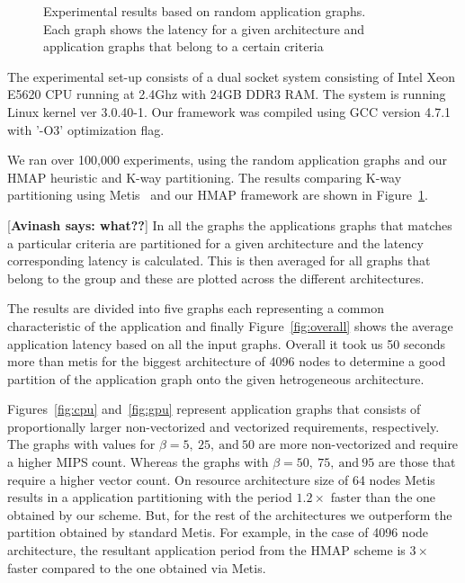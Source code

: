 \begin{figure}[ht!]
{    \label{fig:overall}
  }
  \caption{Experimental results based on random application
  graphs.\\ Each graph shows the latency for a given architecture and
  application graphs that belong to a certain criteria}
  \label{fig:exp-res}
\end{figure}

The experimental set-up consists of a dual socket system consisting of
Intel Xeon E5620 CPU running at 2.4Ghz with 24GB DDR3 RAM. The system
is running Linux kernel ver 3.0.40-1. Our framework was compiled
using GCC version 4.7.1 with '-O3' optimization flag.

We ran over 100,000 experiments, using the random application graphs and
our HMAP heuristic and K-way partitioning.  The results comparing K-way
partitioning using Metis~\cite{gkar95} and our HMAP framework are shown
in Figure~\ref{fig:exp-res}. 

[\textbf{Avinash says: what??}] In all the graphs the applications
graphs that matches a particular criteria are partitioned for a given
architecture and the latency corresponding latency is calculated. This
is then averaged for all graphs that belong to the group and these are
plotted across the different architectures.

The results are divided into five graphs each representing a common
characteristic of the application and finally Figure~\ref{fig:overall}
shows the average application latency based on all the input
graphs. Overall it took us 50 seconds more than metis for the biggest
architecture of 4096 nodes to determine a good partition of the
application graph onto the given hetrogeneous architecture.

Figures~\ref{fig:cpu} and~\ref{fig:gpu} represent application graphs
that consists of proportionally larger non-vectorized and vectorized
requirements, respectively. The graphs with values for $\beta = 5,\ 25,\
\mathrm{and}\ 50$ are more non-vectorized and require a higher MIPS
count. Whereas the graphs with $\beta = 50,\ 75,\ \mathrm{and}\ 95$ are
those that require a higher vector count. On resource architecture size
of 64 nodes Metis results in a application partitioning with the period
$1.2\times$ faster than the one obtained by our scheme. But, for the
rest of the architectures we outperform the partition obtained by
standard Metis. For example, in the case of 4096 node architecture, the
resultant application period from the HMAP scheme is $3\times$ faster
compared to the one obtained via Metis.

